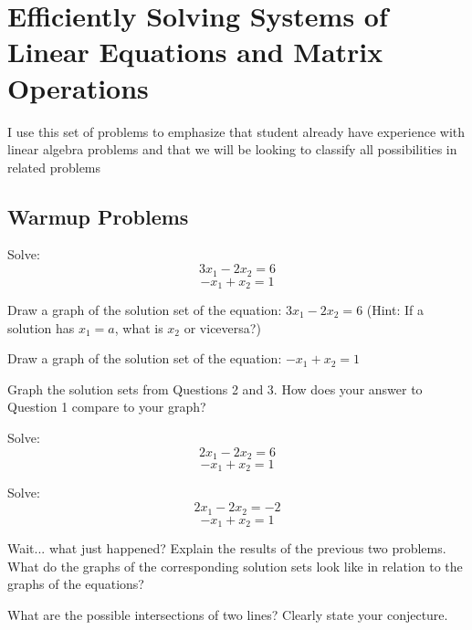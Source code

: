 \mainmatter




\chapter{Efficiently Solving Systems of Linear Equations and Matrix Operations}

\begin{annotation}
I use this set of problems to emphasize that student already have experience with linear algebra problems and that we will be looking to classify all possibilities in related problems
\end{annotation}

\section{Warmup Problems}
\begin{question} Solve:
$$ 3x_1-2x_2=6 $$
$$-x_1+x_2=1 $$
\end{question}

\begin{question} Draw a graph of the solution set of the equation: $3x_1-2x_2=6$ (Hint: If a solution has $x_1=a$, what is $x_2$ or viceversa?)
\end{question}

\begin{question} Draw a graph of the solution set of the equation: $-x_1+x_2=1$
\end{question}

\begin{question}\label{q2} Graph the solution sets from Questions 2 and 3. How does your answer to Question 1 compare to your graph?
\end{question}

\begin{question} Solve:
$$ 2x_1-2x_2=6 $$
$$-x_1+x_2=1 $$
\end{question}

\begin{question} Solve:
$$ 2x_1-2x_2=-2 $$
$$-x_1+x_2=1 $$
\end{question}

\begin{question} Wait... what just happened? Explain the results of the previous two problems. What do the graphs of the corresponding solution sets look like in relation to the graphs of the equations?
\end{question}

\begin{question} What are the possible intersections of two lines? Clearly state your conjecture.
\end{question}

